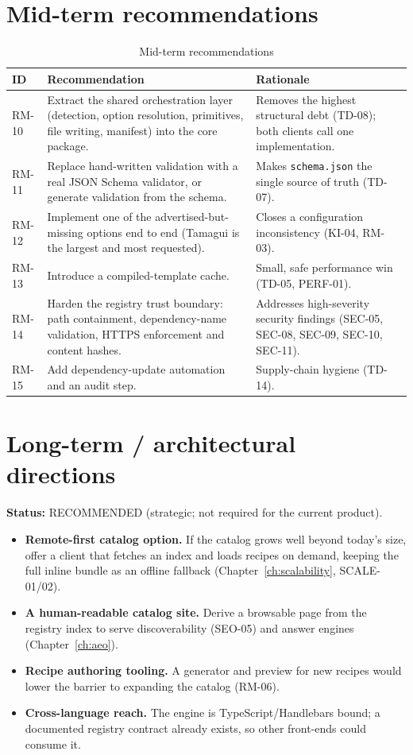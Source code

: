 \section{Mid-term recommendations}

\begin{longtable}{p{1.4cm}p{5.4cm}p{8.4cm}}
\caption{Mid-term recommendations}\\
\toprule
\textbf{ID} & \textbf{Recommendation} & \textbf{Rationale} \\
\midrule

RM-10 & Extract the shared orchestration layer (detection, option resolution,
primitives, file writing, manifest) into the core package. & Removes the highest
structural debt (TD-08); both clients call one implementation. \\
RM-11 & Replace hand-written validation with a real JSON Schema validator, or
generate validation from the schema. & Makes \texttt{schema.json} the single
source of truth (TD-07). \\
RM-12 & Implement one of the advertised-but-missing options end to end (Tamagui
is the largest and most requested). & Closes a configuration inconsistency
(KI-04, RM-03). \\
RM-13 & Introduce a compiled-template cache. & Small, safe performance win
(TD-05, PERF-01). \\
RM-14 & Harden the registry trust boundary: path containment, dependency-name
validation, HTTPS enforcement and content hashes. & Addresses high-severity
security findings (SEC-05, SEC-08, SEC-09, SEC-10, SEC-11). \\
RM-15 & Add dependency-update automation and an audit step. & Supply-chain hygiene
(TD-14). \\
\bottomrule
\end{longtable}

\section{Long-term / architectural directions}

\textbf{Status:} RECOMMENDED (strategic; not required for the current product).

\begin{itemize}
  \item \textbf{Remote-first catalog option.} If the catalog grows well beyond
        today's size, offer a client that fetches an index and loads recipes on
        demand, keeping the full inline bundle as an offline fallback
        (Chapter~\ref{ch:scalability}, SCALE-01/02).
  \item \textbf{A human-readable catalog site.} Derive a browsable page from the
        registry index to serve discoverability (SEO-05) and answer engines
        (Chapter~\ref{ch:aeo}).
  \item \textbf{Recipe authoring tooling.} A generator and preview for new
        recipes would lower the barrier to expanding the catalog (RM-06).
  \item \textbf{Cross-language reach.} The engine is TypeScript/Handlebars bound;
        a documented registry contract already exists, so other front-ends could
        consume it.
\end{itemize}


